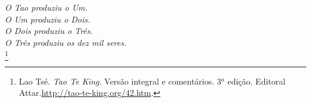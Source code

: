 \begin{dedicatoria}
   \vspace*{\fill}
   \vspace*{\fill}
   \vspace*{\fill}
   \vspace*{\fill}
   \vspace*{\fill}
   \vspace*{\fill}
   \vspace*{\fill}
   \vspace*{\fill}
   \vspace*{\fill}
   \vspace*{\fill}
   \vspace*{\fill}
   \vspace*{\fill}
   \vspace*{\fill}
   \vspace*{\fill}
   \vspace*{\fill}
   \centering \textit{O Tao produziu o Um.\\O Um produziu o Dois.\\O Dois produziu o Três.\\O Tr\^es produziu os dez mil seres.\\}\footnote{Lao Tsé. \emph{Tao Te King}. Versão integral e comentários. 3$^a$ edição. Editoral Attar.\url{http://tao-te-king.org/42.htm}.}
   \vspace*{\fill}
   \vspace*{\fill}
   \vspace*{\fill}
   \vspace*{\fill}
   \vspace*{\fill}
   \vspace*{\fill}
   \vspace*{\fill}
   \vspace*{\fill}
   \vspace*{\fill}
   \vspace*{\fill}
   \vspace*{\fill}
   \vspace*{\fill}
   \vspace*{\fill}
   \vspace*{\fill}
   \vspace*{\fill}
   \vspace*{\fill}
\end{dedicatoria}